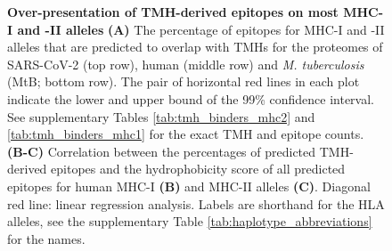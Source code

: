 \begin{figure}[!htbp]
\begin{subfigure}[t]{0.35\textwidth}
    \label{fig:hydrophobicity_2}
  \end{subfigure}  
  \caption{ \textbf{Over-presentation of TMH-derived epitopes on most MHC-I and -II alleles}
    \textbf{(A)} 
    The percentage of epitopes for MHC-I and -II alleles that are predicted to 
    overlap with TMHs for the proteomes of SARS-CoV-2 (top row), human (middle 
    row) and \emph{M. tuberculosis} (MtB; bottom row).
    The pair of horizontal red lines in each plot indicate the lower and upper bound 
    of the 99\% confidence interval.
    See supplementary Tables \ref{tab:tmh_binders_mhc2} and \ref{tab:tmh_binders_mhc1}
    for the exact TMH and  epitope counts.
    \textbf{(B-C)}
    Correlation between the percentages of predicted TMH-derived epitopes
    and the hydrophobicity score of all predicted epitopes for 
    human MHC-I \textbf{(B)} and MHC-II alleles \textbf{(C)}.
    Diagonal red line: linear regression analysis. 
    Labels are shorthand for the HLA alleles,
    see the supplementary Table \ref{tab:haplotype_abbreviations} for the names.
  }
\end{figure}


\clearpage

\thispagestyle{empty}

